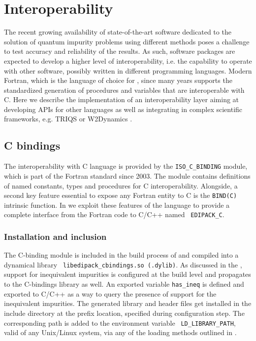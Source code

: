 \documentclass[edipack_sp.tex]{subfiles}
\begin{document}
\section{Interoperability}\label{SecInterop}
The recent growing availability of state-of-the-art software dedicated
to the solution of quantum impurity problems using different methods \cite{Bulla2008RMP,Parcollet2015CPC,Seth2016CPC,Bauernfeind2017PRX,Ganahl2015PRB,Wallerberger2019CPC,Mejuto-Zaera2020PRB}
poses a challenge to test accuracy and reliability of the
results.
As such, software packages are expected to develop a higher level of interoperability, i.e. the capability to operate with other software, possibly written in different programming languages.
Modern Fortran, which is the language of choice for \NAME, since many
years supports the standardized generation of procedures and
variables that are interoperable with C.
Here we describe the implementation of an interoperability layer aiming at developing APIs for other languages as well as 
integrating \NAME in complex scientific frameworks, e.g. TRIQS \cite{Parcollet2015CPC} or W2Dynamics \cite{Wallerberger2019CPC}. 

\subsection{C bindings}\label{sSecInteropCbindings}
The interoperability with C language is provided by the
{\tt ISO\_C\_BINDING} module, which is part of the Fortran
standard since 2003\cite{Reid2003CISE,Reid2007SFF}. The module contains definitions of named
constants, types and procedures for C interoperability.
Alongside, a second key feature essential to expose any Fortran entity to C is the {\tt BIND(C)} intrinsic function.
In \NAME we exploit these features of the language to provide a
complete interface from the Fortran code to C/C++ named {\tt
  EDIPACK\_C}. 


\subsubsection{Installation and inclusion}\label{sSecInteropCbindingsInstallation}
The C-binding module is included in the build process of \NAME and
compiled into a dynamical library {\tt
  libedipack\_cbindings.so (.dylib)}. As discussed in the
, support for inequivalent
impurities is configured at the build level and propagates to the
C-bindings library as well. An exported variable {\tt has\_ineq} is
defined and exported to C/C++ as a way to query the presence of support for the inequivalent impurities. 
The generated library and header files get installed in the include
directory at the prefix location, specified during configuration
step. The corresponding path is added to the environment variable {\tt
  LD\_LIBRARY\_PATH}, valid of any Unix/Linux system, via any of the
loading methods outlined in . 
\end{document}
